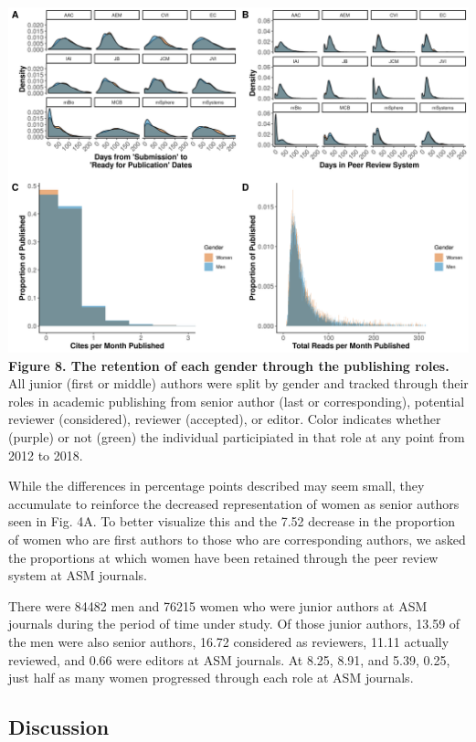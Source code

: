 \documentclass[11pt,]{article}
\begin{document}
\includegraphics{Figure_8.png} \textbf{Figure 8. The retention of each
gender through the publishing roles.} All junior (first or middle)
authors were split by gender and tracked through their roles in academic
publishing from senior author (last or corresponding), potential
reviewer (considered), reviewer (accepted), or editor. Color indicates
whether (purple) or not (green) the individual participiated in that
role at any point from 2012 to 2018.

While the differences in percentage points described may seem small,
they accumulate to reinforce the decreased representation of women as
senior authors seen in Fig. 4A. To better visualize this and the 7.52
decrease in the proportion of women who are first authors to those who
are corresponding authors, we asked the proportions at which women have
been retained through the peer review system at ASM journals.

There were 84482 men and 76215 women who were junior authors at ASM
journals during the period of time under study. Of those junior authors,
13.59 of the men were also senior authors, 16.72 considered as
reviewers, 11.11 actually reviewed, and 0.66 were editors at ASM
journals. At 8.25, 8.91, and 5.39, 0.25, just half as many women
progressed through each role at ASM journals.

\subsection{Discussion}\label{discussion}
\end{document}
